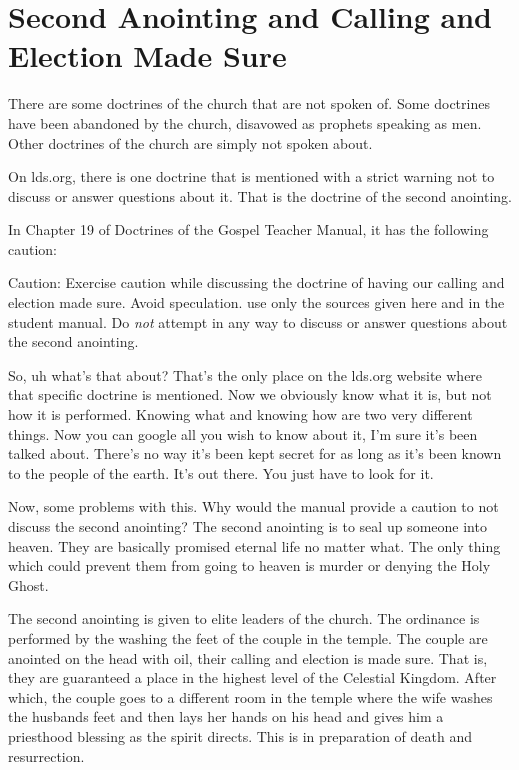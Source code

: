 \chapter{Second Anointing and Calling and Election Made Sure}

There are some doctrines of the church that are not spoken of. Some doctrines 
have been abandoned by the church, disavowed as prophets speaking as men. 
Other doctrines of the church are simply not spoken about.

On lds.org, there is one doctrine that is mentioned with a strict warning not to 
discuss or answer questions about it. That is the doctrine of the second 
anointing.

In Chapter 19 of Doctrines of the Gospel Teacher Manual, it has the following 
caution:

\begin{displayquote}
Caution: Exercise caution while discussing the doctrine of having our calling 
and election made sure. Avoid speculation. use only the sources given here and 
in the student manual. Do \textit{not} attempt in any way to discuss or answer 
questions about the second anointing.
\end{displayquote}

So, uh what’s that about? That’s the only place on the lds.org website where 
that specific doctrine is mentioned. Now we obviously know what it is, but not 
how it is performed. Knowing what and knowing how are two very different things. 
Now you can google all you wish to know about it, I’m sure it’s been talked 
about. There’s no way it’s been kept secret for as long as it’s been known to 
the people of the earth. It’s out there. You just have to look for it.

 Now, some problems with this. Why would the manual provide a caution to not 
 discuss the second anointing? The second anointing is to seal up someone into 
 heaven. They are basically promised eternal life no matter what. The only thing 
 which could prevent them from going to heaven is murder or denying the Holy 
 Ghost.
 
 The second anointing is given to elite leaders of the church. The ordinance is 
 performed by the washing the feet of the couple in the temple. The couple are 
 anointed on the head with oil, their calling and election is made sure. That 
 is, they are guaranteed a place in the highest level of the Celestial Kingdom. 
 After which, the couple goes to a different room in the temple where the wife 
 washes the husbands feet and then lays her hands on his head and gives him a 
 priesthood blessing as the spirit directs. This is in preparation of death and 
 resurrection.
 

